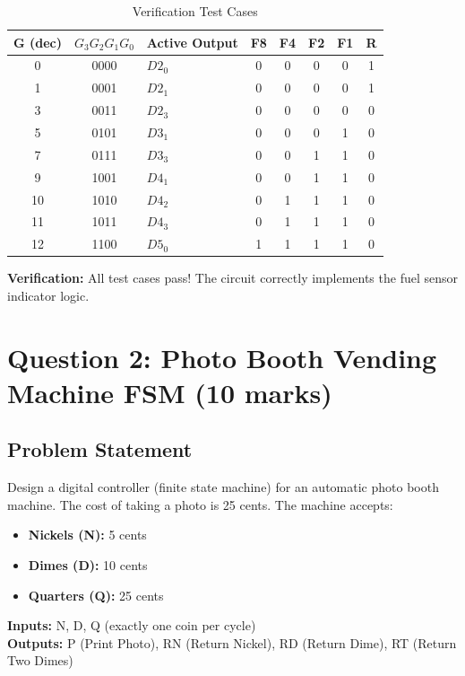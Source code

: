 \documentclass[12pt,a4paper]{article}
\begin{document}
\begin{table}[H]
\centering
\caption{Verification Test Cases}
\begin{tabular}{c|c|l|ccccc}
\toprule
\textbf{G (dec)} & \textbf{$G_3G_2G_1G_0$} & \textbf{Active Output} & \textbf{F8} & \textbf{F4} & \textbf{F2} & \textbf{F1} & \textbf{R} \\
\midrule
0 & 0000 & $D2_0$ & 0 & 0 & 0 & 0 & 1 \\
1 & 0001 & $D2_1$ & 0 & 0 & 0 & 0 & 1 \\
3 & 0011 & $D2_3$ & 0 & 0 & 0 & 0 & 0 \\
5 & 0101 & $D3_1$ & 0 & 0 & 0 & 1 & 0 \\
7 & 0111 & $D3_3$ & 0 & 0 & 1 & 1 & 0 \\
9 & 1001 & $D4_1$ & 0 & 0 & 1 & 1 & 0 \\
10 & 1010 & $D4_2$ & 0 & 1 & 1 & 1 & 0 \\
11 & 1011 & $D4_3$ & 0 & 1 & 1 & 1 & 0 \\
12 & 1100 & $D5_0$ & 1 & 1 & 1 & 1 & 0 \\
\bottomrule
\end{tabular}
\end{table}

\textbf{Verification:} All test cases pass! The circuit correctly implements the fuel sensor indicator logic.

\newpage
\section{Question 2: Photo Booth Vending Machine FSM (10 marks)}

\subsection{Problem Statement}

Design a digital controller (finite state machine) for an automatic photo booth machine. The cost of taking a photo is 25 cents. The machine accepts:
\begin{itemize}
  \item \textbf{Nickels (N):} 5 cents
  \item \textbf{Dimes (D):} 10 cents
  \item \textbf{Quarters (Q):} 25 cents
\end{itemize}

\textbf{Inputs:} N, D, Q (exactly one coin per cycle)\\
\textbf{Outputs:} P (Print Photo), RN (Return Nickel), RD (Return Dime), RT (Return Two Dimes)
\end{document}
